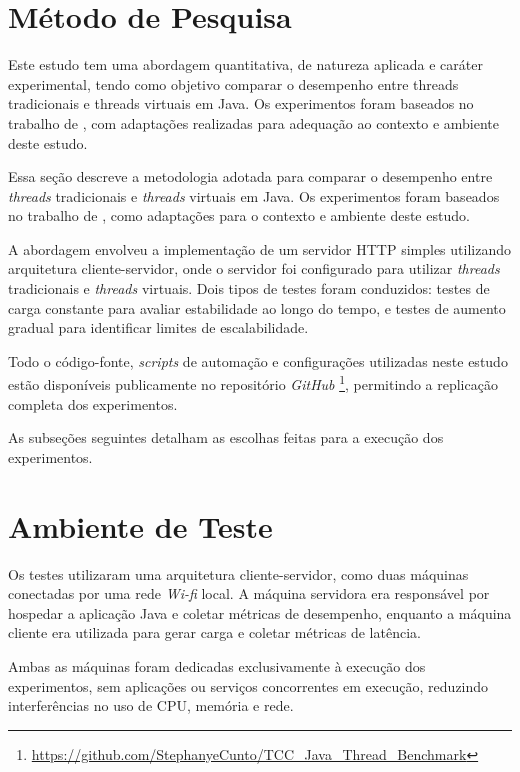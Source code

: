 \documentclass[12pt, openright, oneside, a4paper, english,	french,	spanish, brazil	]{abntex2}
\begin{document}
    \section{Método de Pesquisa}

    Este estudo tem uma abordagem quantitativa, de natureza aplicada e caráter experimental, tendo como objetivo comparar o desempenho entre threads tradicionais e threads virtuais em Java. Os experimentos foram baseados no trabalho de \cite{GustafssonPersson2024}, com adaptações realizadas para adequação ao contexto e ambiente deste estudo.

    Essa seção descreve a metodologia adotada para comparar o desempenho entre \textit{threads} tradicionais e \textit{threads} virtuais em Java. Os experimentos foram baseados no trabalho de , como adaptações para o contexto e ambiente deste estudo.

    A abordagem envolveu a implementação de um servidor HTTP simples utilizando arquitetura cliente-servidor, onde o servidor foi configurado para utilizar \textit{threads} tradicionais e \textit{threads} virtuais. Dois tipos de testes foram conduzidos: testes de carga constante para avaliar estabilidade ao longo do tempo, e testes de aumento gradual para identificar limites de escalabilidade.

    
    Todo o código-fonte, \textit{scripts} de automação e configurações utilizadas neste estudo estão disponíveis publicamente no repositório \textit{GitHub} \footnote{\url{https://github.com/StephanyeCunto/TCC_Java_Thread_Benchmark}}, permitindo a replicação completa dos experimentos.
    
    As subseções seguintes detalham as escolhas feitas para a execução dos experimentos.

    \section{Ambiente de Teste}

    Os testes utilizaram uma arquitetura cliente-servidor, como duas máquinas conectadas por uma rede \textit{Wi-fi} local. A máquina servidora era responsável por hospedar a aplicação Java e coletar métricas de desempenho, enquanto a máquina cliente era utilizada para gerar carga e coletar métricas de latência.

    Ambas as máquinas foram dedicadas exclusivamente à execução dos experimentos, sem aplicações ou serviços concorrentes em execução, reduzindo interferências no uso de CPU, memória e rede.
\end{document}
